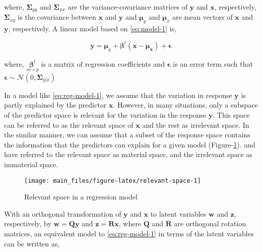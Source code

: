 \documentclass[12pt,3p,authoryear]{elsarticle}
\begin{document}
where, \(\boldsymbol{\Sigma}_{yy}\) and \(\boldsymbol{\Sigma}_{xx}\) are
the variance-covariance matrices of \(\mathbf{y}\) and \(\mathbf{x}\),
respectively, \(\boldsymbol{\Sigma}_{xy}\) is the covariance between
\(\mathbf{x}\) and \(\mathbf{y}\) and \(\boldsymbol{\mu}_y\) and
\(\boldsymbol{\mu}_x\) are mean vectors of \(\mathbf{x}\) and
\(\mathbf{y}\), respectively. A linear model based on \eqref{eq:model-1}
is,

\begin{equation}
\mathbf{y} = \boldsymbol{\mu}_y + 
  \boldsymbol{\beta}^t(\mathbf{x} - \boldsymbol{\mu_x}) + 
  \boldsymbol{\epsilon}
\label{eq:reg-model-1}
\end{equation}

where, \(\underset{m\times p}{\boldsymbol{\beta}^t}\) is a matrix of
regression coefficients and \(\boldsymbol{\epsilon}\) is an error term
such that
\(\boldsymbol{\epsilon} \sim \mathcal{N}(0, \boldsymbol{\Sigma}_{y|x})\)

In a model like \eqref{eq:reg-model-1}, we assume that the variation in
response \(\mathbf{y}\) is partly explained by the predictor
\(\mathbf{x}\). However, in many situations, only a subspace of the
predictor space is relevant for the variation in the response
\(\mathbf{y}\). This space can be referred to as the relevant space of
\(\mathbf{x}\) and the rest as irrelevant space. In the similar manner,
we can assume that a subset of the response space contains the
information that the predictors can explain for a given model
(Figure-\ref{fig:relevant-space}). \citet{cook2010envelope} and
\citet{cook2015simultaneous} have referred to the relevant space as
material space, and the irrelevant space as immaterial space.

\begin{figure}

{\centering \texttt{[image: main\_files/figure-latex/relevant-space-1]} 

}

\caption{Relevant space in a regression model}\label{fig:relevant-space}
\end{figure}

With an orthogonal transformation of \(\mathbf{y}\) and \(\mathbf{x}\)
to latent variables \(\mathbf{w}\) and \(\mathbf{z}\), respectively, by
\(\mathbf{w=Qy}\) and \(\mathbf{z = Rx}\), where \(\mathbf{Q}\) and
\(\mathbf{R}\) are orthogonal rotation matrices, an equivalent model to
\eqref{eq:reg-model-1} in terms of the latent variables can be written as,
\end{document}
